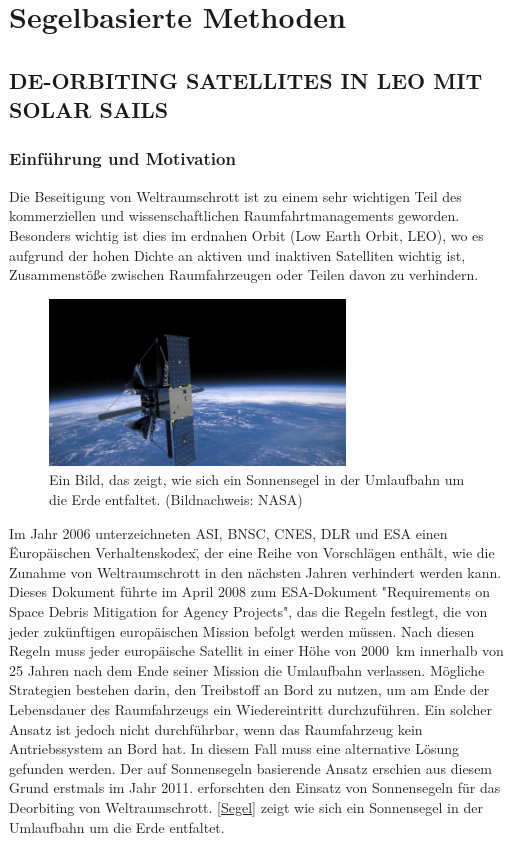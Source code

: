 \documentclass{article}
\begin{document}
\section{Segelbasierte Methoden}\label{sec:segel}
\subsection{DE-ORBITING SATELLITES IN LEO MIT SOLAR SAILS}
\subsubsection{Einführung und Motivation}
Die Beseitigung von Weltraumschrott ist zu einem sehr wichtigen Teil des kommerziellen und wissenschaftlichen Raumfahrtmanagements geworden. Besonders wichtig ist dies im erdnahen Orbit (Low Earth Orbit, LEO), wo es aufgrund der hohen Dichte an aktiven und inaktiven Satelliten wichtig ist, Zusammenstöße zwischen Raumfahrzeugen oder Teilen davon zu verhindern. 
\begin{figure}[htbp]
	\centering
	\includegraphics[width=0.7\textwidth]{bilder/Segel.png}
	\caption{Ein Bild, das zeigt, wie sich ein Sonnensegel in der Umlaufbahn um die Erde entfaltet. (Bildnachweis: NASA)}
	\label{Segel}
\end{figure}
Im Jahr 2006 unterzeichneten ASI, BNSC, CNES, DLR und ESA einen \"Europäischen Verhaltenskodex\", der eine Reihe von Vorschlägen enthält, wie die Zunahme von Weltraumschrott in den nächsten Jahren verhindert werden kann. Dieses Dokument führte im April 2008 zum ESA-Dokument "Requirements on Space Debris Mitigation for Agency Projects", das die Regeln festlegt, die von jeder zukünftigen europäischen Mission befolgt werden müssen. Nach diesen Regeln muss jeder europäische Satellit in einer Höhe von \SI{2000}{\kilo \meter} innerhalb von 25 Jahren nach dem Ende seiner Mission die Umlaufbahn verlassen. Mögliche Strategien bestehen darin, den Treibstoff an Bord zu nutzen, um am Ende der Lebensdauer des Raumfahrzeugs ein Wiedereintritt durchzuführen. Ein solcher Ansatz ist jedoch nicht durchführbar, wenn das Raumfahrzeug kein Antriebssystem an Bord hat. In diesem Fall muss eine alternative Lösung gefunden werden. Der auf Sonnensegeln basierende Ansatz erschien aus diesem Grund erstmals im Jahr 2011. \citet{Daniele:2012} erforschten den Einsatz von Sonnensegeln für das Deorbiting von Weltraumschrott. \autoref{Segel} zeigt wie sich ein Sonnensegel in der Umlaufbahn um die Erde entfaltet.
\end{document}
